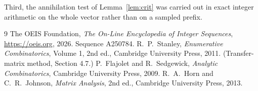 \documentclass[11pt,a4paper]{article}
\theoremstyle{plain}
\theoremstyle{definition}
\begin{document}
Third, the annihilation test of Lemma~\ref{lem:crit} was carried out in exact integer
arithmetic on the whole vector rather than on a sampled prefix.

\begin{thebibliography}{9}
 The OEIS Foundation, \emph{The On-Line Encyclopedia of Integer
Sequences}, \url{https://oeis.org}, 2026. Sequence A250784.
 R.~P.~Stanley, \emph{Enumerative Combinatorics}, Volume 1, 2nd ed.,
Cambridge University Press, 2011. (Transfer-matrix method, Section 4.7.)
 P.~Flajolet and R.~Sedgewick, \emph{Analytic Combinatorics}, Cambridge
University Press, 2009.
 R.~A.~Horn and C.~R.~Johnson, \emph{Matrix Analysis}, 2nd ed., Cambridge
University Press, 2013.
\end{thebibliography}
\end{document}
